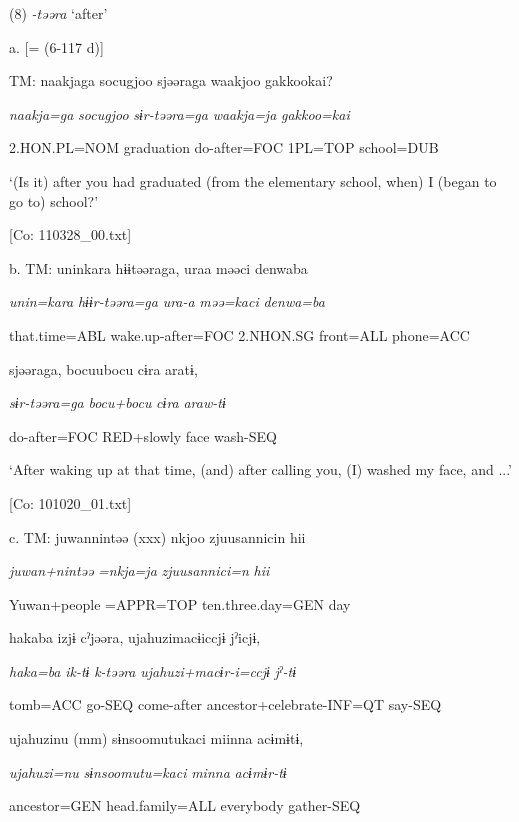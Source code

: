 (8)  \textit{{}-təəra} ‘after’

  a.  [= (6-117 d)]

    TM:  naakjaga  {\textbar}socugjoo{\textbar}  sjəəraga  waakjoo  {\textbar}gakkoo{\textbar}kai?

      \textit{naakja=ga}  \textit{socugjoo}  \textit{sɨr-təəra=ga}  \textit{waakja=ja}  \textit{gakkoo=kai}

      2.HON.PL=NOM  graduation  do-after=FOC  1PL=TOP  school=DUB

      ‘(Is it) after you had graduated (from the elementary school, when) I (began to go to) school?’

      [Co: 110328\_00.txt]

  b.  TM:  uninkara  hɨɨtəəraga,  uraa  məəci  {\textbar}denwa{\textbar}ba

      \textit{unin=kara}  \textit{hɨɨr-təəra=ga}  \textit{ura-a}  \textit{məə=kaci}  \textit{denwa=ba}

      that.time=ABL  wake.up-after=FOC  2.NHON.SG  front=ALL  phone=ACC

      sjəəraga,  bocuubocu  cɨra  aratɨ,

      \textit{sɨr-təəra=ga}  \textit{bocu+bocu}  \textit{cɨra}  \textit{araw-tɨ}

      do-after=FOC  RED+slowly  face  wash-SEQ

      ‘After waking up at that time, (and) after calling you, (I) washed my face, and ...’

      [Co: 101020\_01.txt]

  c.  TM:  juwannintəə  (xxx)  nkjoo  {\textbar}zjuusannici{\textbar}n  hii

      \textit{juwan+nintəə}    \textit{=nkja=ja}  \textit{zjuusannici=n}  \textit{hii}

      Yuwan+people    =APPR=TOP  ten.three.day=GEN  day

      hakaba  izjɨ  cˀjəəra,  ujahuzimacɨiccjɨ  jˀicjɨ,

      \textit{haka=ba}  \textit{ik-tɨ}  \textit{k-təəra}  \textit{ujahuzi+macɨr-i=ccjɨ}  \textit{jˀ-tɨ}

      tomb=ACC  go-SEQ  come-after  ancestor+celebrate-INF=QT  say-SEQ

      ujahuzinu  (mm)  sɨnsoomutukaci  miinna  acɨmɨtɨ,

      \textit{ujahuzi=nu}    \textit{sɨnsoomutu=kaci}  \textit{minna}  \textit{acɨmɨr-tɨ}

      ancestor=GEN    head.family=ALL  everybody  gather-SEQ


